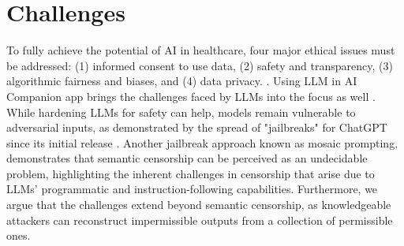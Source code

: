 \section{Challenges}
To fully achieve the potential of AI in healthcare, four major ethical issues must be addressed: (1) informed consent to use data, (2) safety and transparency, (3) algorithmic fairness and biases, and (4) data privacy. \cite{gerke2020ethical}. Using LLM in AI Companion app brings the challenges faced by LLMs into the focus as well \cite{sarker2024llm}. While hardening LLMs for safety can help, models remain vulnerable to adversarial inputs, as demonstrated by the spread of "jailbreaks" for ChatGPT since its initial release \cite{andriushchenko2024jailbreaking}. Another jailbreak approach known as mosaic prompting, demonstrates that semantic censorship can be perceived as an undecidable problem, highlighting the inherent challenges in censorship that arise due to LLMs' programmatic and instruction-following capabilities. Furthermore, we argue that the challenges extend beyond semantic censorship, as knowledgeable attackers can reconstruct impermissible outputs from a collection of permissible ones.